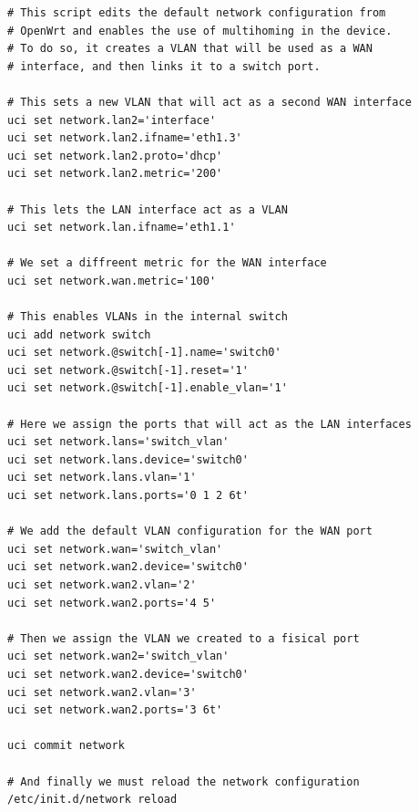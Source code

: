 \documentclass[11pt]{article}
\begin{document}
\begin{lstlisting}[frame=single]
# This script edits the default network configuration from 
# OpenWrt and enables the use of multihoming in the device.
# To do so, it creates a VLAN that will be used as a WAN 
# interface, and then links it to a switch port.

# This sets a new VLAN that will act as a second WAN interface
uci set network.lan2='interface'
uci set network.lan2.ifname='eth1.3'
uci set network.lan2.proto='dhcp'
uci set network.lan2.metric='200'

# This lets the LAN interface act as a VLAN
uci set network.lan.ifname='eth1.1'

# We set a diffreent metric for the WAN interface
uci set network.wan.metric='100'

# This enables VLANs in the internal switch
uci add network switch
uci set network.@switch[-1].name='switch0'
uci set network.@switch[-1].reset='1'
uci set network.@switch[-1].enable_vlan='1'

# Here we assign the ports that will act as the LAN interfaces
uci set network.lans='switch_vlan'
uci set network.lans.device='switch0'
uci set network.lans.vlan='1'
uci set network.lans.ports='0 1 2 6t'

# We add the default VLAN configuration for the WAN port
uci set network.wan='switch_vlan'
uci set network.wan2.device='switch0'
uci set network.wan2.vlan='2'
uci set network.wan2.ports='4 5'

# Then we assign the VLAN we created to a fisical port
uci set network.wan2='switch_vlan'
uci set network.wan2.device='switch0'
uci set network.wan2.vlan='3'
uci set network.wan2.ports='3 6t'

uci commit network

# And finally we must reload the network configuration
/etc/init.d/network reload
\end{lstlisting}
\end{document}
